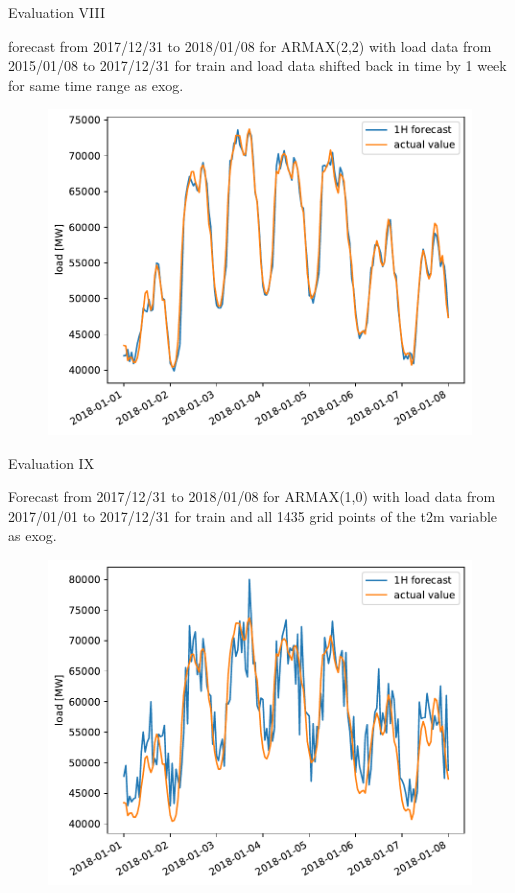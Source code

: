 \documentclass[t,xcolor={table},fleqn]{beamer}
\begin{document}
\begin{frame}{Evaluation VIII}

forecast from 2017/12/31 to 2018/01/08 for ARMAX(2,2) with load data from 2015/01/08 to 2017/12/31 for train and load data shifted back in time by 1 week for same time range as exog.

\begin{figure}[h!]%
\centering
\includegraphics[height=.8\textheight]{../doc/plots/ARMAXfc/ARMAX_p2q2_data2015to2017_fcto2018123100_load_lag_plot_range2018010100_2018010800}%
\end{figure}%

\end{frame}


\begin{frame}{Evaluation IX}

Forecast from 2017/12/31 to 2018/01/08 for ARMAX(1,0) with load data from 2017/01/01 to 2017/12/31 for train and all 1435 grid points of the t2m variable as exog.

\begin{figure}[h!]%
\centering
\includegraphics[height=.8\textheight]{../doc/plots/ARMAXfc/ARMAX_p1q0_data2017010100to2017123100_fc2017123101to2018010800_t2m_all}%
\end{figure}%

\end{frame}
\end{document}
